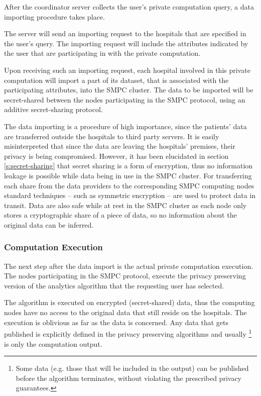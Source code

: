 After the coordinator server collects the user's private computation query, a data importing procedure takes place.

The server will send an importing request to the hospitals that are specified in the user's query.
The importing request will include the attributes indicated by the user that are participating in with the private computation.

Upon receiving such an importing request, each hospital involved in this private computation will import a part of its dataset, that is associated with the participating attributes, into the SMPC cluster.
The data to be imported will be secret\hyp shared between the nodes participating in the SMPC protocol, using an additive secret\hyp sharing protocol.

The data importing is a procedure of high importance, since the patients' data are transferred outside the hospitals to third party servers.
It is easily misinterpreted that since the data are leaving the hospitals' premises, their privacy is being compromised.
However, it has been elucidated in section \ref{s:secret-sharing} that secret sharing is a form of encryption, thus no information leakage is possible while data being in use in the SMPC cluster.
For transferring each share from the data providers to the corresponding SMPC computing nodes standard techniques -- such as symmetric encryption -- are used to protect data in transit.
Data are also safe while at rest in the SMPC cluster as each node only stores a cryptographic share of a piece of data, so no information about the original data can be inferred.

\subsubsection{Computation Execution}\label{sss:computation-execution}

The next step after the data import is the actual private computation execution.
The nodes participating in the SMPC protocol, execute the privacy preserving version of the analytics algorithm that the requesting user has selected.

The algorithm is executed on encrypted (secret\hyp shared) data, thus the computing nodes have no access to the original data that still reside on the hospitals.
The execution is oblivious as far as the data is concerned.
Any data that gets published is explicitly defined in the privacy preserving algorithms and usually \footnote{Some data (e.g. those that will be included in the output) can be published before the algorithm terminates, without violating the prescribed privacy guarantees.} is only the computation output.

